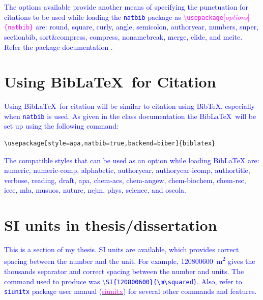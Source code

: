 \documentclass[phd,showgrids]{ndsu-thesis-2022}
\newcommand\italk[1]{\textcolor{blue}{#1}}  %
\newcommand\cmd[1]{\textbackslash\texttt{#1}}  %
\newcommand\vb[1]{\textcolor{blue}{\texttt{#1}}}%
\begin{document}
\italk{
The options available provide another means of specifying the punctuation
for citations to be used while loading the \texttt{natbib} package as \textcolor{magenta}{\cmd{usepackage}[\emph{options}]\texttt{\{natbib\}}} are: \textbullet\:round, \textbullet\:square, \textbullet\:curly, \textbullet\:angle, \textbullet\:semicolon, \textbullet\:authoryear, \textbullet\:numbers, \textbullet\:super, \textbullet\:sectionbib, \textbullet\:sort\&compress, \textbullet\:compress, \textbullet\:nonamebreak, \textbullet\:merge, \textbullet\:elide, and \textbullet\:mcite. Refer the package documentation \citep{daly2010natural}.  
}

\section{Using Bib\LaTeX\ for Citation}
\italk{Using Bib\LaTeX\ for citation will be similar to citation using BibTeX, especially when \vb{natbib} is used. As given in the class documentation the Bib\LaTeX\ will be set up using the following command:
}

\vspace{2ex}
{\singlespacing
\begin{verbatim}
\usepackage[style=apa,natbib=true,backend=biber]{biblatex}
\end{verbatim}
}

\italk{The compatible styles that can be used as an option while loading Bib\LaTeX\/ are: \textbullet\:numeric, \textbullet\:numeric-comp, \textbullet\:alphabetic, \textbullet\:authoryear, \textbullet\:authoryear-icomp, \textbullet\:authortitle, \textbullet\:verbose, \textbullet\:reading, \textbullet\:draft, \textbullet\:apa, \textbullet\:chem-acs, \textbullet\:chem-angew, \textbullet\:chem-biochem, \textbullet\:chem-rsc, \textbullet\:ieee, \textbullet\:mla, \textbullet\:musuos, \textbullet\:nuture, \textbullet\:nejm, \textbullet\:phys, \textbullet\:science, and \textbullet\:oscola.}



\section{SI units in thesis/dissertation}
\italk{This is a section of my thesis. SI units are available, which provides correct spacing between the number and the unit. For example, \SI{120800600}{\m\squared} gives the thousands separator and correct spacing between the number and units. The command used to produce was \textbackslash\texttt{SI\{120800600\}\{\textbackslash m\textbackslash squared\}}.  Also, refer to \texttt{siunitx} package user manual (\href{https://mirror.mwt.me/ctan/macros/latex/contrib/siunitx/siunitx.pdf}{\textcolor{magenta}{siunitx}}) for several other commands and features.} 
\end{document}
